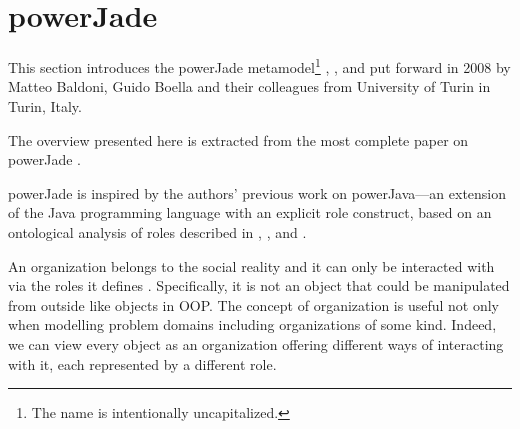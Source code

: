 
\section{powerJade}

This section introduces the powerJade metamodel\footnote{The name is intentionally uncapitalized.} \cite{Baldoni08a}, \cite{Baldoni08b}, \cite{Baldoni09} and \cite{Baldoni10} put forward in 2008 by Matteo Baldoni, Guido Boella and their colleagues from University of Turin in Turin, Italy.

The overview presented here is extracted from the most complete paper on powerJade \cite{Baldoni10}.


powerJade is inspired by the authors' previous work on powerJava---an extension of the Java programming language with an explicit role construct, based on an ontological analysis of roles described in \cite{Baldoni05}, \cite{Baldoni06a}, \cite{Baldoni06b} and \cite{Baldoni07}.

An organization belongs to the social reality and it can only be interacted with via the roles it defines \cite{Boella06}.
Specifically, it is not an object that could be manipulated from outside like objects in OOP.
The concept of organization is useful not only when modelling problem domains including organizations of some kind.
Indeed, we can view every object as an organization offering different ways of interacting with it, each represented by a different role.

